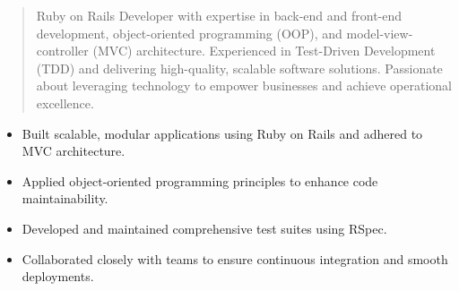 



\makecvheader

\begin{quote}
  \noindent
  Ruby on Rails Developer with expertise in back-end and front-end development, object-oriented programming (OOP), and model-view-controller (MVC) architecture. Experienced in Test-Driven Development (TDD) and delivering high-quality, scalable software solutions. Passionate about leveraging technology to empower businesses and achieve operational excellence.
\end{quote}

\par\smallskip
\noindent
\begin{minipage}{20cm}
  \begin{minipage}{9.75cm}
    \begin{itemize}
      \item Built scalable, modular applications using Ruby on Rails and adhered to MVC architecture.
      \item Applied object-oriented programming principles to enhance code maintainability.
    \end{itemize}
  \end{minipage}
  \hfill
  \begin{minipage}{9.75cm}
    \begin{itemize}
      \item Developed and maintained comprehensive test suites using RSpec.
      \item Collaborated closely with teams to ensure continuous integration and smooth deployments.
    \end{itemize}
  \end{minipage}
\end{minipage}
\par\smallskip
\divider

